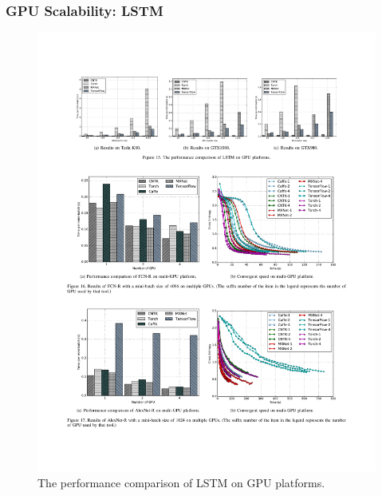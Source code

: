 \begin{frame}
	\MyLogo
	\frametitle{GPU Scalability: LSTM}
	
	\begin{figure}[htbp] 
		\includegraphics[width=\linewidth]{figures/LSTM2.pdf} 
		\caption{The performance comparison of LSTM on GPU platforms.}
	\end{figure}
	
\end{frame}